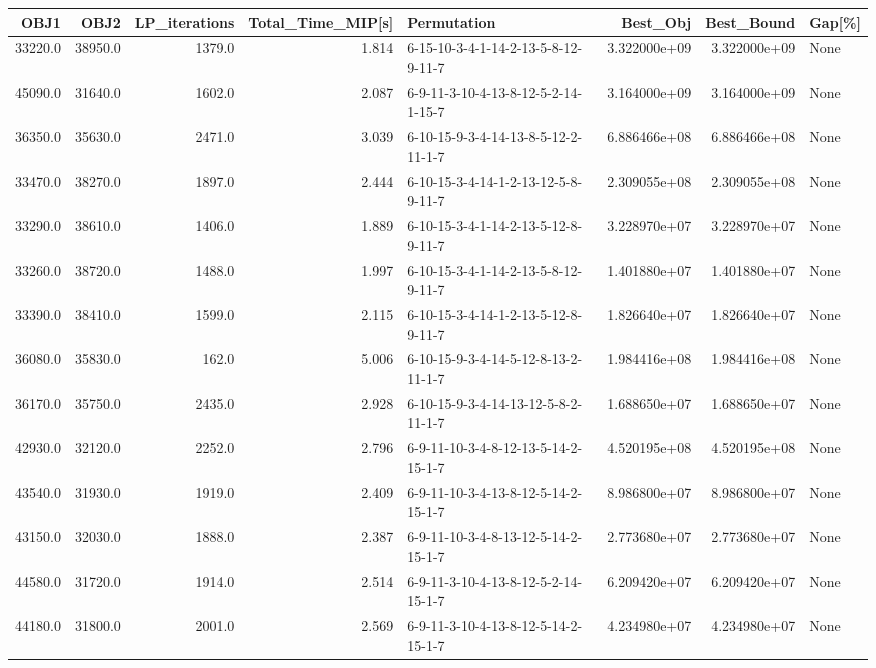 \begin{tabular}{rrrrlrrl}
\toprule
    OBJ1 &     OBJ2 &  LP\_iterations &  Total\_Time\_MIP[s] &                          Permutation &      Best\_Obj &    Best\_Bound & Gap[\%] \\
\midrule
 33220.0 &  38950.0 &         1379.0 &              1.814 &  6-15-10-3-4-1-14-2-13-5-8-12-9-11-7 &  3.322000e+09 &  3.322000e+09 &   None \\
 45090.0 &  31640.0 &         1602.0 &              2.087 &  6-9-11-3-10-4-13-8-12-5-2-14-1-15-7 &  3.164000e+09 &  3.164000e+09 &   None \\
 36350.0 &  35630.0 &         2471.0 &              3.039 &  6-10-15-9-3-4-14-13-8-5-12-2-11-1-7 &  6.886466e+08 &  6.886466e+08 &   None \\
 33470.0 &  38270.0 &         1897.0 &              2.444 &  6-10-15-3-4-14-1-2-13-12-5-8-9-11-7 &  2.309055e+08 &  2.309055e+08 &   None \\
 33290.0 &  38610.0 &         1406.0 &              1.889 &  6-10-15-3-4-1-14-2-13-5-12-8-9-11-7 &  3.228970e+07 &  3.228970e+07 &   None \\
 33260.0 &  38720.0 &         1488.0 &              1.997 &  6-10-15-3-4-1-14-2-13-5-8-12-9-11-7 &  1.401880e+07 &  1.401880e+07 &   None \\
 33390.0 &  38410.0 &         1599.0 &              2.115 &  6-10-15-3-4-14-1-2-13-5-12-8-9-11-7 &  1.826640e+07 &  1.826640e+07 &   None \\
 36080.0 &  35830.0 &          162.0 &              5.006 &  6-10-15-9-3-4-14-5-12-8-13-2-11-1-7 &  1.984416e+08 &  1.984416e+08 &   None \\
 36170.0 &  35750.0 &         2435.0 &              2.928 &  6-10-15-9-3-4-14-13-12-5-8-2-11-1-7 &  1.688650e+07 &  1.688650e+07 &   None \\
 42930.0 &  32120.0 &         2252.0 &              2.796 &  6-9-11-10-3-4-8-12-13-5-14-2-15-1-7 &  4.520195e+08 &  4.520195e+08 &   None \\
 43540.0 &  31930.0 &         1919.0 &              2.409 &  6-9-11-10-3-4-13-8-12-5-14-2-15-1-7 &  8.986800e+07 &  8.986800e+07 &   None \\
 43150.0 &  32030.0 &         1888.0 &              2.387 &  6-9-11-10-3-4-8-13-12-5-14-2-15-1-7 &  2.773680e+07 &  2.773680e+07 &   None \\
 44580.0 &  31720.0 &         1914.0 &              2.514 &  6-9-11-3-10-4-13-8-12-5-2-14-15-1-7 &  6.209420e+07 &  6.209420e+07 &   None \\
 44180.0 &  31800.0 &         2001.0 &              2.569 &  6-9-11-3-10-4-13-8-12-5-14-2-15-1-7 &  4.234980e+07 &  4.234980e+07 &   None \\
\bottomrule
\end{tabular}
